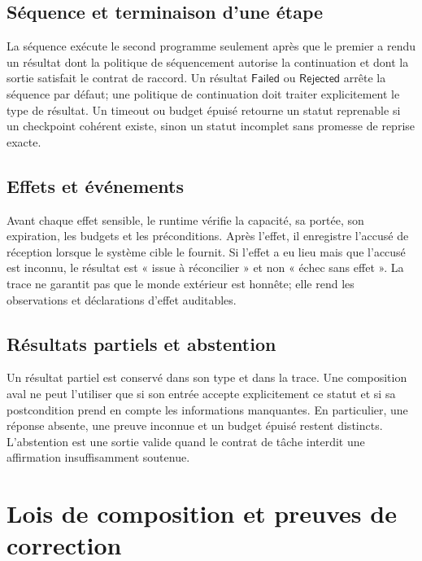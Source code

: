\documentclass[11pt,a4paper,openany]{book}
\theoremstyle{definition}
\theoremstyle{plain}
\theoremstyle{remark}
\begin{document}
\section{Séquence et terminaison d'une étape}
La séquence exécute le second programme seulement après que le premier a rendu un résultat dont la politique de séquencement autorise la continuation et dont la sortie satisfait le contrat de raccord. Un résultat $\mathsf{Failed}$ ou $\mathsf{Rejected}$ arrête la séquence par défaut; une politique de continuation doit traiter explicitement le type de résultat. Un timeout ou budget épuisé retourne un statut reprenable si un checkpoint cohérent existe, sinon un statut incomplet sans promesse de reprise exacte.

\section{Effets et événements}
Avant chaque effet sensible, le runtime vérifie la capacité, sa portée, son expiration, les budgets et les préconditions. Après l'effet, il enregistre l'accusé de réception lorsque le système cible le fournit. Si l'effet a eu lieu mais que l'accusé est inconnu, le résultat est « issue à réconcilier » et non « échec sans effet ». La trace ne garantit pas que le monde extérieur est honnête; elle rend les observations et déclarations d'effet auditables.

\section{Résultats partiels et abstention}
Un résultat partiel est conservé dans son type et dans la trace. Une composition aval ne peut l'utiliser que si son entrée accepte explicitement ce statut et si sa postcondition prend en compte les informations manquantes. En particulier, une réponse absente, une preuve inconnue et un budget épuisé restent distincts. L'abstention est une sortie valide quand le contrat de tâche interdit une affirmation insuffisamment soutenue.

\chapter{Lois de composition et preuves de correction}
\end{document}
